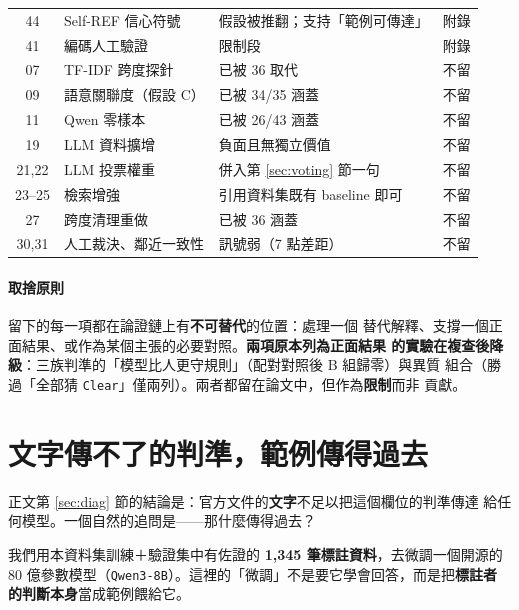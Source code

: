 \documentclass[11pt,a4paper]{ctexart}
\newcommand{\fn}[1]{\texttt{#1}}
\begin{document}
\begin{longtable}{@{}clp{6.6cm}c@{}}
\midrule
44 & Self-REF 信心符號 & 假設被推翻；支持「範例可傳達」 & 附錄 \\
41 & 編碼人工驗證 & 限制段 & 附錄 \\
\midrule
07 & TF-IDF 跨度探針 & 已被 36 取代 & 不留 \\
09 & 語意關聯度（假設 C） & 已被 34/35 涵蓋 & 不留 \\
11 & Qwen 零樣本 & 已被 26/43 涵蓋 & 不留 \\
19 & LLM 資料擴增 & 負面且無獨立價值 & 不留 \\
21,22 & LLM 投票權重 & 併入第 \ref{sec:voting} 節一句 & 不留 \\
23--25 & 檢索增強 & 引用資料集既有 baseline 即可 & 不留 \\
27 & 跨度清理重做 & 已被 36 涵蓋 & 不留 \\
30,31 & 人工裁決、鄰近一致性 & 訊號弱（7 點差距） & 不留 \\
\bottomrule
\end{longtable}

\paragraph{取捨原則} 留下的每一項都在論證鏈上有\textbf{不可替代}的位置：處理一個
替代解釋、支撐一個正面結果、或作為某個主張的必要對照。\textbf{兩項原本列為正面結果
的實驗在複查後降級}：三族判準的「模型比人更守規則」（配對對照後 B 組歸零）與異質
組合（勝過「全部猜 \fn{Clear}」僅兩列）。兩者都留在論文中，但作為\textbf{限制}而非
貢獻。

\section{文字傳不了的判準，範例傳得過去}
\label{app:selfref}

正文第 \ref{sec:diag} 節的結論是：官方文件的\textbf{文字}不足以把這個欄位的判準傳達
給任何模型。一個自然的追問是——那什麼傳得過去？

\medskip
我們用本資料集訓練＋驗證集中有佐證的 \textbf{1{,}345 筆標註資料}，去微調一個開源的
80 億參數模型（\fn{Qwen3-8B}）。這裡的「微調」不是要它學會回答，而是把\textbf{標註者
的判斷本身}當成範例餵給它。
\end{document}
